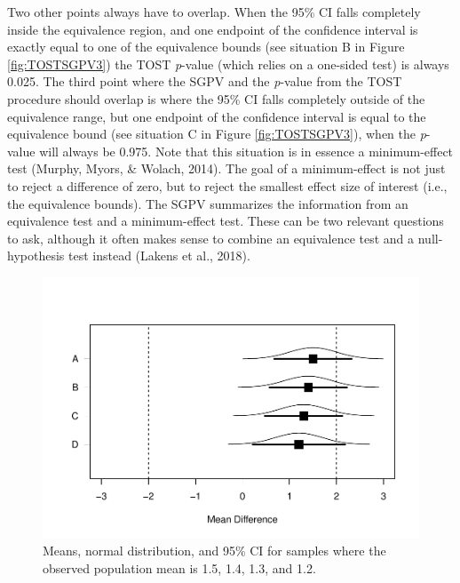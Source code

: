 \documentclass[,man,floatsintext]{apa6}
\begin{document}
Two other points always have to overlap. When the 95\% CI falls completely inside the equivalence region, and one endpoint of the confidence interval is exactly equal to one of the equivalence bounds (see situation B in Figure \ref{fig:TOSTSGPV3}) the TOST \emph{p}-value (which relies on a one-sided test) is always 0.025. The third point where the SGPV and the \emph{p}-value from the TOST procedure should overlap is where the 95\% CI falls completely outside of the equivalence range, but one endpoint of the confidence interval is equal to the equivalence bound (see situation C in Figure \ref{fig:TOSTSGPV3}), when the \emph{p}-value will always be 0.975. Note that this situation is in essence a minimum-effect test (Murphy, Myors, \& Wolach, 2014). The goal of a minimum-effect is not just to reject a difference of zero, but to reject the smallest effect size of interest (i.e., the equivalence bounds). The SGPV summarizes the information from an equivalence test and a minimum-effect test. These can be two relevant questions to ask, although it often makes sense to combine an equivalence test and a null-hypothesis test instead (Lakens et al., 2018).

\begin{figure}
\centering
\includegraphics{manuscript_files/figure-latex/TOSTSGPV4-1.pdf}
\caption{\label{fig:TOSTSGPV4}Means, normal distribution, and 95\% CI for samples where the observed population mean is 1.5, 1.4, 1.3, and 1.2.}
\end{figure}
\end{document}
